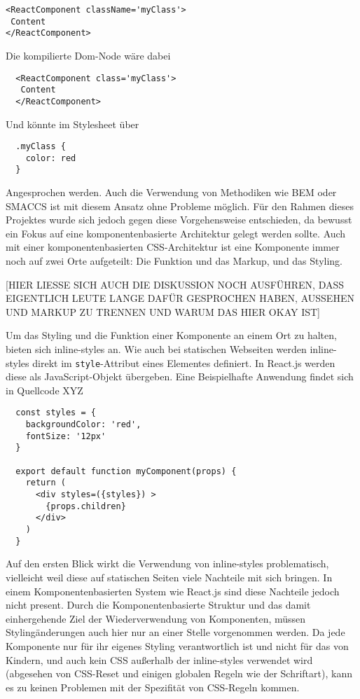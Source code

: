 \begin{lstlisting}
<ReactComponent className='myClass'>
 Content
</ReactComponent>
\end{lstlisting}

Die kompilierte Dom-Node wäre dabei

\begin{lstlisting}
  <ReactComponent class='myClass'>
   Content
  </ReactComponent>
\end{lstlisting}

Und könnte im Stylesheet über

\begin{lstlisting}
  .myClass {
    color: red
  }
\end{lstlisting}

Angesprochen werden. Auch die Verwendung von Methodiken wie BEM oder SMACCS ist mit diesem Ansatz ohne Probleme möglich.
Für den Rahmen dieses Projektes wurde sich jedoch gegen diese Vorgehensweise entschieden, da bewusst ein Fokus auf eine komponentenbasierte Architektur gelegt werden sollte. Auch mit einer komponentenbasierten CSS-Architektur ist eine Komponente immer noch auf zwei Orte aufgeteilt: Die Funktion und das Markup, und das Styling.

[HIER LIESSE SICH AUCH DIE DISKUSSION NOCH AUSFÜHREN, DASS EIGENTLICH LEUTE LANGE DAFÜR GESPROCHEN HABEN, AUSSEHEN UND MARKUP ZU TRENNEN UND WARUM DAS HIER OKAY IST]

Um das Styling und die Funktion einer Komponente an einem Ort zu halten, bieten sich inline-styles an. Wie auch bei statischen Webseiten werden inline-styles direkt im \verb|style|-Attribut eines Elementes definiert. In React.js werden diese als JavaScript-Objekt übergeben. Eine Beispielhafte Anwendung findet sich in Quellcode XYZ

\begin{lstlisting}
  const styles = {
    backgroundColor: 'red',
    fontSize: '12px'
  }

  export default function myComponent(props) {
    return (
      <div styles=({styles}) >
  		{props.children}
  	  </div>
    )
  }
\end{lstlisting}

Auf den ersten Blick wirkt die Verwendung von inline-styles problematisch, vielleicht weil diese auf statischen Seiten viele Nachteile mit sich bringen. In einem Komponentenbasierten System wie React.js sind diese Nachteile jedoch nicht present. Durch die Komponentenbasierte Struktur und das damit einhergehende Ziel der Wiederverwendung von Komponenten, müssen Stylingänderungen auch hier nur an einer Stelle vorgenommen werden. Da jede Komponente nur für ihr eigenes Styling verantwortlich ist und nicht für das von Kindern, und auch kein CSS außerhalb der inline-styles verwendet wird (abgesehen von CSS-Reset und einigen globalen Regeln wie der Schriftart), kann es zu keinen Problemen mit der Spezifität von CSS-Regeln kommen.

